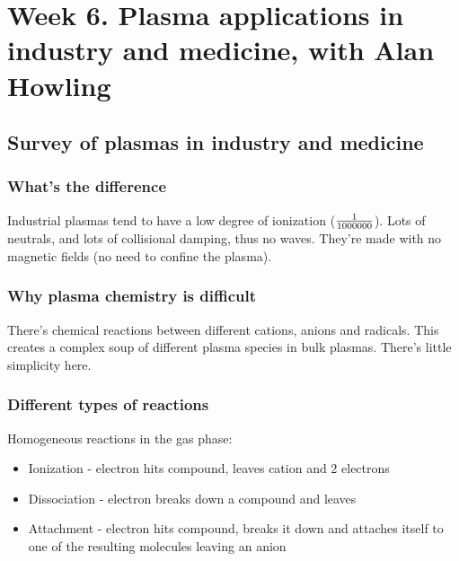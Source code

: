 \documentclass[PlasmaNotes.tex]{subfiles}
\begin{document}
\setcounter{section}{5}

\let\oldexp\exp
\renewcommand{\exp}[1]{\oldexp(#1)}

\section{Week 6. Plasma applications in industry and medicine, with Alan Howling}

\subsection{Survey of plasmas in industry and medicine}

\subsubsection{What's the difference}

Industrial plasmas tend to have a low degree of ionization ($\frac{1}{1 000 000}$). Lots of neutrals, and lots of collisional damping, thus no waves. They're made with no magnetic fields (no need to confine the plasma). 

\subsubsection{Why plasma chemistry is difficult}

There's chemical reactions between different cations, anions and radicals. This creates a complex soup of different plasma species in bulk plasmas. There's little simplicity here.

\subsubsection{Different types of reactions}

Homogeneous reactions in the gas phase:
\begin{itemize}
\item Ionization - electron hits compound, leaves cation and 2 electrons
\item Dissociation - electron breaks down a compound and leaves 
\item Attachment - electron hits compound, breaks it down and attaches itself to one of the resulting molecules leaving an anion
\end{itemize}
\end{document}
